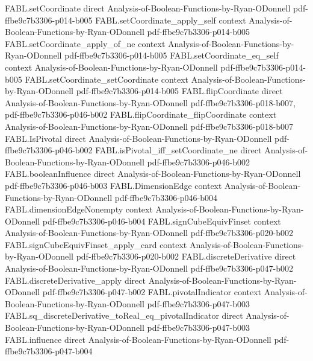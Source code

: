 \begin{theorem}
  {FABL.setCoordinate}
  {direct}
  {Analysis-of-Boolean-Functions-by-Ryan-ODonnell}
  {pdf-ffbe9c7b3306-p014-b005}
\proofstep
  {FABL.setCoordinate_apply_self}
  {context}
  {Analysis-of-Boolean-Functions-by-Ryan-ODonnell}
  {pdf-ffbe9c7b3306-p014-b005}
\proofstep
  {FABL.setCoordinate_apply_of_ne}
  {context}
  {Analysis-of-Boolean-Functions-by-Ryan-ODonnell}
  {pdf-ffbe9c7b3306-p014-b005}
\proofstep
  {FABL.setCoordinate_eq_self}
  {context}
  {Analysis-of-Boolean-Functions-by-Ryan-ODonnell}
  {pdf-ffbe9c7b3306-p014-b005}
\proofstep
  {FABL.setCoordinate_setCoordinate}
  {context}
  {Analysis-of-Boolean-Functions-by-Ryan-ODonnell}
  {pdf-ffbe9c7b3306-p014-b005}
\proofstep
  {FABL.flipCoordinate}
  {direct}
  {Analysis-of-Boolean-Functions-by-Ryan-ODonnell}
  {pdf-ffbe9c7b3306-p018-b007,
    pdf-ffbe9c7b3306-p046-b002}
\proofstep
  {FABL.flipCoordinate_flipCoordinate}
  {context}
  {Analysis-of-Boolean-Functions-by-Ryan-ODonnell}
  {pdf-ffbe9c7b3306-p018-b007}
\proofstep
  {FABL.IsPivotal}
  {direct}
  {Analysis-of-Boolean-Functions-by-Ryan-ODonnell}
  {pdf-ffbe9c7b3306-p046-b002}
\proofstep
  {FABL.isPivotal_iff_setCoordinate_ne}
  {direct}
  {Analysis-of-Boolean-Functions-by-Ryan-ODonnell}
  {pdf-ffbe9c7b3306-p046-b002}
\proofstep
  {FABL.booleanInfluence}
  {direct}
  {Analysis-of-Boolean-Functions-by-Ryan-ODonnell}
  {pdf-ffbe9c7b3306-p046-b003}
\proofstep
  {FABL.DimensionEdge}
  {context}
  {Analysis-of-Boolean-Functions-by-Ryan-ODonnell}
  {pdf-ffbe9c7b3306-p046-b004}
\proofstep
  {FABL.dimensionEdgeNonempty}
  {context}
  {Analysis-of-Boolean-Functions-by-Ryan-ODonnell}
  {pdf-ffbe9c7b3306-p046-b004}
\proofstep
  {FABL.signCubeEquivFinset}
  {context}
  {Analysis-of-Boolean-Functions-by-Ryan-ODonnell}
  {pdf-ffbe9c7b3306-p020-b002}
\proofstep
  {FABL.signCubeEquivFinset_apply_card}
  {context}
  {Analysis-of-Boolean-Functions-by-Ryan-ODonnell}
  {pdf-ffbe9c7b3306-p020-b002}
\proofstep
  {FABL.discreteDerivative}
  {direct}
  {Analysis-of-Boolean-Functions-by-Ryan-ODonnell}
  {pdf-ffbe9c7b3306-p047-b002}
\proofstep
  {FABL.discreteDerivative_apply}
  {direct}
  {Analysis-of-Boolean-Functions-by-Ryan-ODonnell}
  {pdf-ffbe9c7b3306-p047-b002}
\proofstep
  {FABL.pivotalIndicator}
  {context}
  {Analysis-of-Boolean-Functions-by-Ryan-ODonnell}
  {pdf-ffbe9c7b3306-p047-b003}
\proofstep
  {FABL.sq_discreteDerivative_toReal_eq_pivotalIndicator}
  {direct}
  {Analysis-of-Boolean-Functions-by-Ryan-ODonnell}
  {pdf-ffbe9c7b3306-p047-b003}
\proofstep
  {FABL.influence}
  {direct}
  {Analysis-of-Boolean-Functions-by-Ryan-ODonnell}
  {pdf-ffbe9c7b3306-p047-b004}

\end{theorem}
